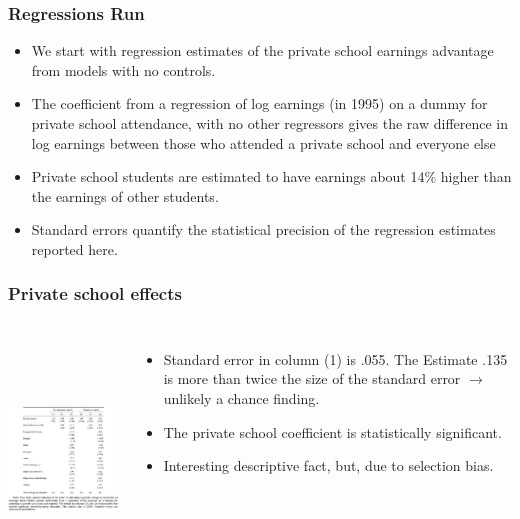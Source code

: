 \documentclass{beamer}
\begin{document}
\begin{frame}
\frametitle{Regressions Run}
\begin{itemize}
	\item We start with regression estimates of the private school earnings advantage from models with no controls.
	\item The coefficient from a regression of log earnings (in 1995) on a dummy for private school attendance, with no other regressors gives the raw difference in log earnings between those who attended a private school and everyone else
	\item Private school students are estimated to have earnings about 14\% higher than the earnings of other students.
	\item Standard errors quantify the statistical precision of the regression estimates reported here. 
\end{itemize}

\end{frame}
\begin{frame}
\frametitle{Private school effects}
\begin{columns}
\includegraphics[width=7cm,height=6.5cm,keepaspectratio]{Table 2.2} 

\begin{itemize}
	\item Standard error in column (1) is .055. The Estimate .135 is more than twice the size of the standard error $\rightarrow$ unlikely a chance finding. 
	\item The private school coefficient is statistically significant.
	\item Interesting descriptive fact, but, due to selection bias.
\end{itemize}

\end{columns}
\end{frame}
\end{document}
